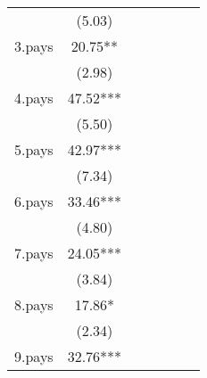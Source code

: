 {\begin{tabular}{l*{6}{c}}
                    &      (5.03)         &                     &                     &                     &                     &                     \\
[1em]
3.pays              &       20.75** &                     &                     &                     &                     &                     \\
                    &      (2.98)         &                     &                     &                     &                     &                     \\
[1em]
4.pays              &       47.52***&                     &                     &                     &                     &                     \\
                    &      (5.50)         &                     &                     &                     &                     &                     \\
[1em]
5.pays              &       42.97***&                     &                     &                     &                     &                     \\
                    &      (7.34)         &                     &                     &                     &                     &                     \\
[1em]
6.pays              &       33.46***&                     &                     &                     &                     &                     \\
                    &      (4.80)         &                     &                     &                     &                     &                     \\
[1em]
7.pays              &       24.05***&                     &                     &                     &                     &                     \\
                    &      (3.84)         &                     &                     &                     &                     &                     \\
[1em]
8.pays              &       17.86*  &                     &                     &                     &                     &                     \\
                    &      (2.34)         &                     &                     &                     &                     &                     \\
[1em]
9.pays              &       32.76***&                     &                     &                     &                     &                     \\

\end{tabular}}
